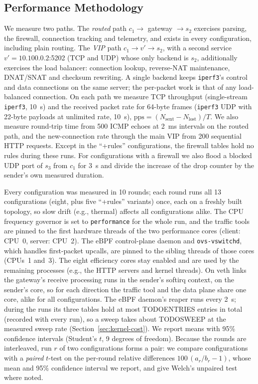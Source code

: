 \documentclass[conference]{IEEEtran}
\begin{document}
\subsection{Performance Methodology}
We measure two paths. The \emph{routed} path $c_1 \to$ gateway $\to s_2$
exercises parsing, the firewall, connection tracking and telemetry, and
exists in every configuration, including plain routing. The \emph{VIP} path
$c_1 \to v' \to s_2$, with a second service $v'=10.100.0.2$:5202 (TCP and UDP)
whose only backend is $s_2$, additionally exercises the load balancer:
connection lookup, reverse-NAT maintenance, DNAT/SNAT and checksum rewriting.
A single backend keeps \texttt{iperf3}'s control and data connections on the
same server; the per-packet work is that of any load-balanced connection. On
each path we measure TCP throughput (single-stream \texttt{iperf3}, 10~s) and
the received packet rate for 64-byte frames (\texttt{iperf3} UDP with 22-byte
payloads at unlimited rate, 10~s), $\mathrm{pps}=(N_{\mathrm{sent}}-
N_{\mathrm{lost}})/T$. We also measure round-trip time from 500 ICMP echoes
at 2~ms intervals on the routed path, and the new-connection rate through the
main VIP from 200 sequential HTTP requests. Except in the ``+rules''
configurations, the firewall tables hold no rules during these runs. For
configurations with a firewall we also flood a
blocked UDP port of $s_3$ from $c_1$ for 3~s and divide the increase of the
drop counter by the sender's own measured duration.

Every configuration was measured in 10 rounds; each round runs all 13
configurations (eight, plus five ``+rules'' variants) once, each on a freshly
built topology, so slow drift (e.g., thermal) affects all configurations
alike. The CPU frequency governor is set
to \texttt{performance} for the whole run, and the traffic tools are pinned to
the first hardware threads of the two performance cores (client: CPU~0,
server: CPU~2). The eBPF control-plane daemon and \texttt{ovs-vswitchd}, which
handles first-packet upcalls, are pinned to the sibling threads of those
cores (CPUs~1 and~3). The eight efficiency cores stay enabled and are used
by the remaining processes (e.g., the HTTP servers and kernel threads). On veth
links the gateway's receive processing runs in the sender's softirq context,
on the sender's core, so for each direction the traffic tool and the data
plane share one core, alike for all configurations. The eBPF daemon's reaper
runs every 2~s; during the runs its three tables hold at most TODOENTRIES
entries in total (recorded with every run), so a sweep takes about TODOSWEEP
at the measured sweep rate (Section~\ref{sec:kernel-cost}). We report means with 95\% confidence intervals (Student's $t$, 9
degrees of freedom). Because the rounds are interleaved, run $r$ of two
configurations forms a pair: we compare configurations with a \emph{paired}
$t$-test on the per-round relative differences $100\,(a_r/b_r-1)$, whose mean
and 95\% confidence interval we report, and give Welch's unpaired test where
noted.
\end{document}
